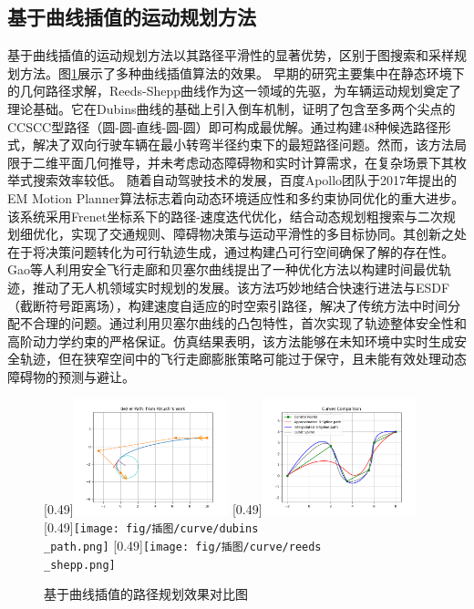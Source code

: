 \documentclass[master,academic]{ysuthesis} %
\begin{document}
		\subsection{基于曲线插值的运动规划方法}
		基于曲线插值的运动规划方法以其路径平滑性的显著优势，区别于图搜索和采样规划方法。图\ref{fig:基于曲线插值的路径规划}展示了多种曲线插值算法的效果。
		早期的研究主要集中在静态环境下的几何路径求解，Reeds-Shepp曲线作为这一领域的先驱，为车辆运动规划奠定了理论基础。它在Dubins曲线的基础上引入倒车机制，证明了包含至多两个尖点的CCSCC型路径（圆-圆-直线-圆-圆）即可构成最优解。通过构建48种候选路径形式，解决了双向行驶车辆在最小转弯半径约束下的最短路径问题。然而，该方法局限于二维平面几何推导，并未考虑动态障碍物和实时计算需求，在复杂场景下其枚举式搜索效率较低。
		随着自动驾驶技术的发展，百度Apollo团队于2017年提出的EM Motion Planner算法标志着向动态环境适应性和多约束协同优化的重大进步。该系统采用Frenet坐标系下的路径-速度迭代优化，结合动态规划粗搜索与二次规划细优化，实现了交通规则、障碍物决策与运动平滑性的多目标协同。其创新之处在于将决策问题转化为可行轨迹生成，通过构建凸可行空间确保了解的存在性。
		Gao等人利用安全飞行走廊和贝塞尔曲线提出了一种优化方法以构建时间最优轨迹，推动了无人机领域实时规划的发展。该方法巧妙地结合快速行进法与ESDF（截断符号距离场），构建速度自适应的时空索引路径，解决了传统方法中时间分配不合理的问题。通过利用贝塞尔曲线的凸包特性，首次实现了轨迹整体安全性和高阶动力学约束的严格保证。仿真结果表明，该方法能够在未知环境中实时生成安全轨迹，但在狭窄空间中的飞行走廊膨胀策略可能过于保守，且未能有效处理动态障碍物的预测与避让。
		\begin{figure}[H]
			\centering
			[0.49\textwidth]{\includegraphics[width=0.4\textwidth]{fig/插图/curve/bezier.png}}
			[0.49\textwidth]{\includegraphics[width=0.4\textwidth]{fig/插图/curve/bspline.png}}
			[0.49\textwidth]{\texttt{[image: fig/插图/curve/dubins\\\_path.png]}}
			[0.49\textwidth]{\texttt{[image: fig/插图/curve/reeds\\\_shepp.png]}}
			\caption{基于曲线插值的路径规划效果对比图}
			\label{fig:基于曲线插值的路径规划}
		\end{figure}
		
\end{document}

